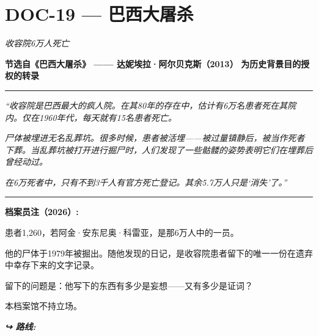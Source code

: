 \section*{\textbf{DOC-19} --- 巴西大屠杀}

\noindent \textit{收容院6万人死亡}

\noindent \textbf{节选自《巴西大屠杀》 —— 达妮埃拉·阿尔贝克斯（2013）}
\textbf{为历史背景目的授权的转录}

\vspace{0.5em}\noindent\rule{\textwidth}{0.5pt}\vspace{0.5em}

\noindent \textit{“收容院是巴西最大的疯人院。在其80年的存在中，估计有6万名患者死在其院内。仅在1960年代，每天就有15名患者死亡。}

\noindent \textit{尸体被埋进无名乱葬坑。很多时候，患者被活埋——被过量镇静后，被当作死者下葬。当乱葬坑被打开进行掘尸时，人们发现了一些骷髅的姿势表明它们在埋葬后曾经动过。}

\noindent \textit{在6万死者中，只有不到3千人有官方死亡登记。其余5.7万人只是‘消失’了。”}

\vspace{0.5em}\noindent\rule{\textwidth}{0.5pt}\vspace{0.5em}

\noindent \textbf{档案员注（2026）:}

\noindent 患者1,260，若阿金·安东尼奥·科雷亚，是那6万人中的一员。

\noindent 他的尸体于1979年被掘出。随他发现的日记，是收容院患者留下的唯一一份在遗弃中幸存下来的文字记录。

\noindent 留下的问题是：他写下的东西有多少是妄想——又有多少是证词？

\noindent 本档案馆不持立场。

\vspace{0.5em}
\noindent\textit{\textbf{↪ 路线:}  \rotasep {} \rotasep {}}
